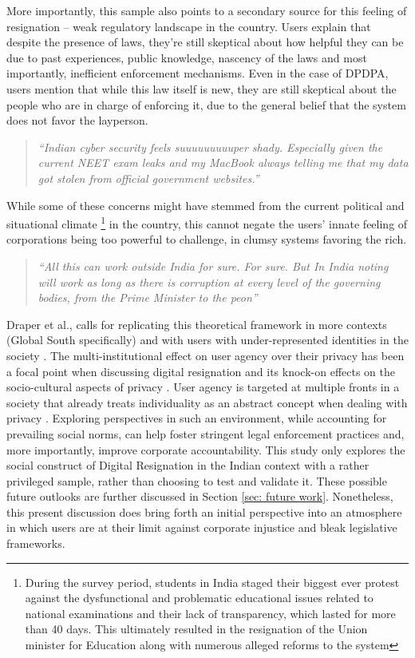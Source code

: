 More importantly, this sample also points to a secondary source for this feeling of resignation – weak regulatory landscape in the country. Users explain that despite the presence of laws, they're still skeptical about how helpful they can be due to past experiences, public knowledge, nascency of the laws and most importantly, inefficient enforcement mechanisms. Even in the case of DPDPA, users mention that while this law itself is new, they are still skeptical about the people who are in charge of enforcing it, due to the general belief that the system does not favor the layperson.

\begin{quote}
    \textit{``Indian cyber security feels suuuuuuuuuper shady. Especially given the current NEET exam leaks and my MacBook always telling me that my data got stolen from official government websites.''}
\end{quote}

While some of these concerns might have stemmed from the current political and situational climate \footnote{During the survey period, students in India staged their biggest ever protest against the dysfunctional and problematic educational issues related to national examinations and their lack of transparency, which lasted for more than 40 days. This ultimately resulted in the resignation of the Union minister for Education along with numerous alleged reforms to the system} in the country, this cannot negate the users' innate feeling of corporations being too powerful to challenge, in clumsy systems favoring the rich.

\begin{quote}
    \textit{``All this can work outside India for sure. For sure. But In India noting will work as long as there is corruption at every level of the governing bodies, from the Prime Minister to the peon''}
\end{quote}

Draper et al., calls for replicating this theoretical framework in more contexts (Global South specifically) and with users with under-represented identities in the society \cite{doi:10.1177/20539517241270663}. The multi-institutional effect on user agency over their privacy has been a focal point when discussing digital resignation and its knock-on effects on the socio-cultural aspects of privacy \cite{doi:10.1177/20539517241270663}. User agency is targeted at multiple fronts in a society that already treats individuality as an abstract concept when dealing with privacy \cite{srinivasan2018poverty, chakraborty_virtuous_2025, popuri_i_nodate}. Exploring perspectives in such an environment, while accounting for prevailing social norms, can help foster stringent legal enforcement practices and, more importantly, improve corporate accountability. This study only explores the social construct of Digital Resignation in the Indian context with a rather privileged sample, rather than choosing to test and validate it. These possible future outlooks are further discussed in Section \ref{sec: future work}. Nonetheless, this present discussion does bring forth an initial perspective into an atmosphere in which users are at their limit against corporate injustice and bleak legislative frameworks. 